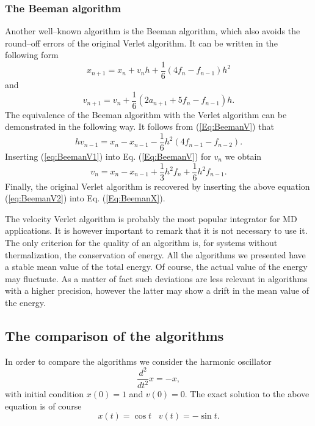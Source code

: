 \subsubsection{The Beeman algorithm}
Another well--known algorithm is the Beeman algorithm, which also avoids the
round--off errors of the original Verlet algorithm. It can be written in the
following form
\begin{equation}
\label{Eq:BeemanX}
  x_{n+1} = x_n + v_n h + \frac{1}{6} (4 f_n - f_{n-1}) h^2
\end{equation}
and
\begin{equation}
\label{Eq:BeemanV}
  v_{n+1} = v_n + \frac{1}{6} (2 a_{n+1} + 5 f_n - f_{n-1})h.
\end{equation}
The equivalence of the Beeman algorithm with the Verlet algorithm can be
demonstrated in the following way. It follows from (\ref{Eq:BeemanV})
that
\begin{equation}
  \label{eq:BeemanV1}
  h v_{n-1} = x_n - x_{n-1} - \frac{1}{6} h^2(4 f_{n-1} - f_{n-2}).
\end{equation}
Inserting (\ref{eq:BeemanV1}) into Eq. (\ref{Eq:BeemanV}) for $v_n$ we obtain
\begin{equation}
  \label{eq:BeemanV2}
  v_n = x_n - x_{n-1} + \frac{1}{3} h^2 f_n + \frac{1}{6} h^2 f_{n-1}.
\end{equation}
Finally, the original Verlet algorithm is recovered by inserting the above
equation (\ref{eq:BeemanV2}) into Eq. (\ref{Eq:BeemanX}).

The velocity Verlet
algorithm is probably the most popular integrator for MD applications. It is
however important to remark that it is not necessary to use it. The only
criterion for the quality of an algorithm is, for systems without
thermalization, the conservation of energy. All the algorithms we presented
have a stable mean value of the total energy. Of course, the 
actual value of the
energy may fluctuate. As a matter of fact such deviations are less relevant in
algorithms with a higher precision, however the latter may show a drift in the
mean value of the energy.

\subsection{The comparison of the algorithms}
In order to compare the algorithms we consider the harmonic oscillator
\begin{displaymath}
  \frac{d^2}{dt^2}x = - x,
\end{displaymath}
with initial condition $x(0) = 1$ and $v(0)= 0$.
The exact solution to the above equation is of course
\begin{displaymath}
  x(t) = \cos t \;\;\; v(t) = - \sin t.
\end{displaymath}

